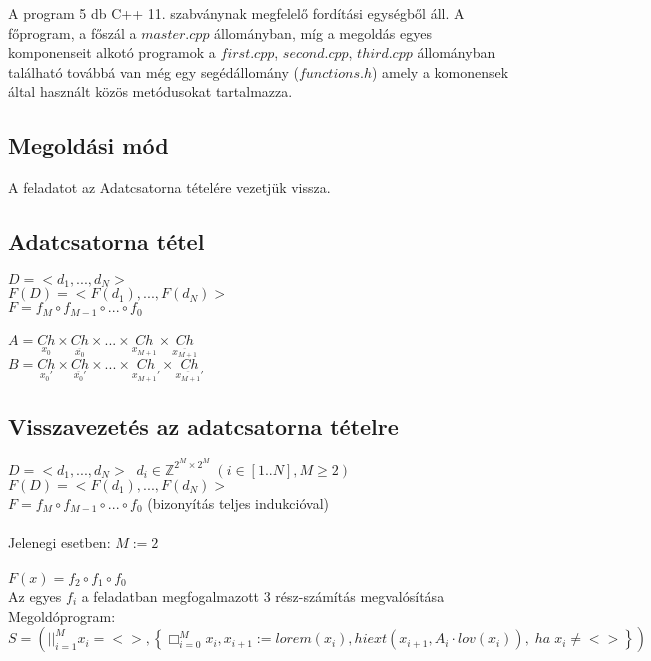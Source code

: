 \documentclass[12pt]{article}
\begin{document}
A program 5 db C++ 11. szabványnak megfelelő fordítási egységből áll. A főprogram, a főszál a $master.cpp$ állományban, míg a megoldás egyes komponenseit alkotó programok a $first.cpp$, $second.cpp$, $third.cpp$ állományban található továbbá van még egy segédállomány ($functions.h$) amely a komonensek által használt közös metódusokat tartalmazza.

\subsection{Megoldási mód}

A feladatot az Adatcsatorna tételére vezetjük vissza.

\subsection{Adatcsatorna tétel}
$D=<d_{1},...,d_{N}>$ \\
$F(D)=<F(d_{1}),...,F(d_{N})>$ \\
$ F= f_{M}\circ f_{M-1}\circ ...\circ f_{0}$ \\ \\
$A=\underset{x_{0}}{Ch}\times\underset{\overline{x_{0}}}{Ch}\times ... \times\underset{x_{M+1}}{Ch}\times\underset{\overline{x_{M+1}}}{Ch}$ \\
$B=\underset{x_{0}'}{Ch}\times\underset{\overline{x_{0}}'}{Ch}\times ... \times\underset{x_{M+1}'}{Ch}\times\underset{\overline{x_{M+1}}'}{Ch}$ \\	
\subsection{Visszavezetés az adatcsatorna tételre}
$D=<d_{1},...,d_{N}>\;\; d_{i}\in\mathbb{Z}^{2^{M}\times 2^{M}}\; (i\in [1..N], M \geq 2)$ \\
$F(D)=<F(d_{1}),...,F(d_{N})>\;\;$ \\
$F=f_{M}\circ f_{M-1}\circ ...\circ f_{0}$ (bizonyítás teljes indukcióval) \\ \\
Jelenegi esetben: $M := 2$ \\ \\
$F(x)=f_{2}\circ f_{1}\circ f_{0}$ \\
Az egyes $f_{i}$ a feladatban megfogalmazott 3 rész-számítás megvalósítása\\

Megoldóprogram:\\
$S=(||_{i=1}^{M}x_{i}=<>,\left\{ \Box_{i=0}^{M}x_{i},x_{i+1}:=lorem(x_{i}),hiext(x_{i+1},A_{i}\cdot lov(x_{i})),\; ha\; x_{i}\neq <>\right\} )$ \\
\\ \\
\end{document}
